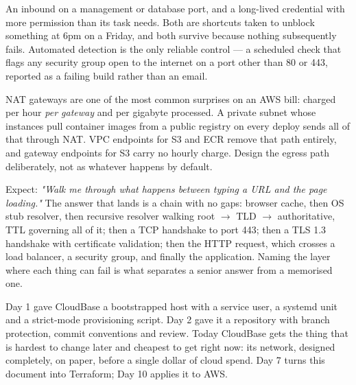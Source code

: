 \begin{secwarn}
An inbound  on a management or database port, and a long-lived credential with more permission than its task needs. Both are shortcuts taken to unblock something at 6pm on a Friday, and both survive because nothing subsequently fails. Automated detection is the only reliable control --- a scheduled check that flags any security group open to the internet on a port other than 80 or 443, reported as a failing build rather than an email.
\end{secwarn}

\begin{costnote}
NAT gateways are one of the most common surprises on an AWS bill: charged per hour \emph{per gateway} and per gigabyte processed. A private subnet whose instances pull container images from a public registry on every deploy sends all of that through NAT. VPC endpoints for S3 and ECR remove that path entirely, and gateway endpoints for S3 carry no hourly charge. Design the egress path deliberately, not as whatever happens by default.
\end{costnote}

\begin{interview}
Expect: \emph{"Walk me through what happens between typing a URL and the page loading."} The answer that lands is a chain with no gaps: browser cache, then OS stub resolver, then recursive resolver walking root $\rightarrow$ TLD $\rightarrow$ authoritative, TTL governing all of it; then a TCP handshake to port 443; then a TLS 1.3 handshake with certificate validation; then the HTTP request, which crosses a load balancer, a security group, and finally the application. Naming the layer where each thing can fail is what separates a senior answer from a memorised one.
\end{interview}


Day 1 gave CloudBase a bootstrapped host with a service user, a systemd unit and a strict-mode provisioning script. Day 2 gave it a repository with branch protection, commit conventions and review. Today CloudBase gets the thing that is hardest to change later and cheapest to get right now: its network, designed completely, on paper, before a single dollar of cloud spend. Day 7 turns this document into Terraform; Day 10 applies it to AWS.

